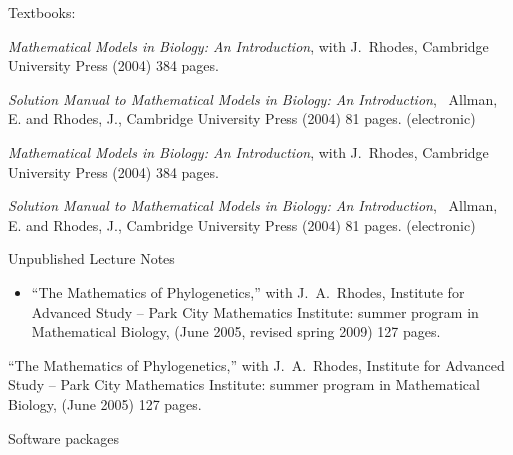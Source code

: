 \documentclass[10pt]{report}
\begin{document}
{\begin{itemize}
\end{itemize}



{\sc Textbooks:}


{
\begin{revnumerate}[2]
 \setlength{\itemsep}{2pt}
 \setlength{\parskip}{0pt}
 \setlength{\parsep}{0pt}

\item {\it Mathematical Models in Biology: An Introduction},
with J.~Rhodes, Cambridge University Press (2004) 384 pages.

\item 
{\it Solution Manual to Mathematical Models in Biology: An
Introduction}, \ Allman, E.  and Rhodes, J., Cambridge University
Press (2004) 81 pages.  (electronic)

\end{revnumerate}
}
{
{\it Mathematical Models in Biology: An Introduction},
with J.~Rhodes, Cambridge University Press (2004) 384 pages.

{\it Solution Manual to Mathematical Models in Biology: An
Introduction}, \ Allman, E.  and Rhodes, J., Cambridge University
Press (2004) 81 pages.  (electronic)
}

\medskip

{\sc Unpublished Lecture Notes}

\smallskip

 \setlength{\itemsep}{2pt}
 \setlength{\parskip}{0pt}
 \setlength{\parsep}{0pt}


{\begin{itemize}
\item
``The Mathematics of Phylogenetics,'' with J.~A.~Rhodes, Institute for
Advanced Study -- Park City Mathematics Institute: summer program in
Mathematical Biology, (June 2005, revised spring 2009) 127 pages.
\end{itemize}
}
{
``The Mathematics of Phylogenetics,'' with J.~A.~Rhodes, Institute for
Advanced Study -- Park City Mathematics Institute: summer program in
Mathematical Biology, (June 2005) 127 pages.
}

\medskip

{\sc Software packages}

\smallskip

 \begin{itemize}
 

\end{itemize}}
\end{document}
